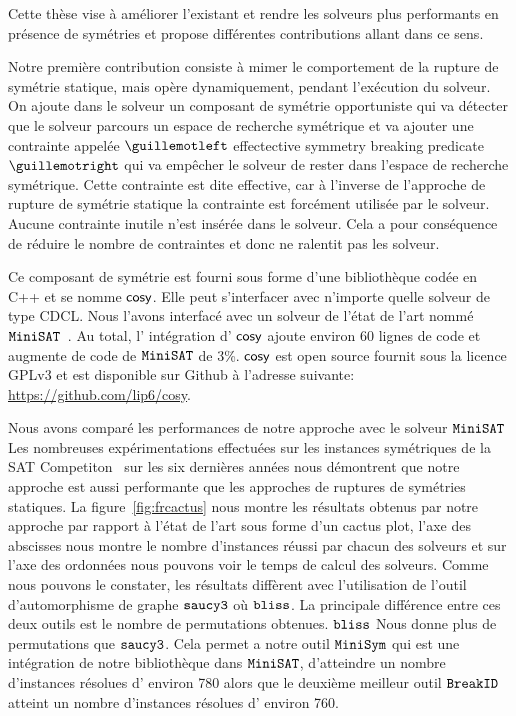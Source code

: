 Cette thèse vise à améliorer l'existant et rendre les solveurs plus performants en présence de symétries et
propose différentes contributions allant dans ce sens.  


Notre première contribution consiste à mimer le comportement de la rupture de symétrie statique, mais 
opère dynamiquement, pendant l'exécution du solveur. On ajoute dans le solveur un composant de symétrie opportuniste qui va détecter que le solveur parcours un espace de recherche symétrique et va ajouter
une contrainte appelée $\guillemotleft$ effectective symmetry breaking predicate $\guillemotright$ qui va empêcher le solveur de rester dans
l'espace de recherche symétrique. Cette contrainte est dite effective, car à l'inverse de l'approche 
de rupture de symétrie  statique la contrainte est forcément utilisée par le solveur. Aucune contrainte
inutile n’est insérée dans le solveur. Cela a pour conséquence de réduire le nombre de contraintes et donc 
ne ralentit pas les solveur.


Ce composant de symétrie est fourni sous forme d'une bibliothèque codée en C++ et se nomme $\textsf{cosy}$.
Elle peut s'interfacer avec n'importe quelle solveur de type CDCL. 
Nous l'avons interfacé avec un solveur de l'état de l'art nommé $\texttt{MiniSAT}$~\cite{een2003extensible}. Au total, l' intégration d’ $\textsf{cosy}$ ajoute environ 60 lignes de code 
et augmente de code de $\texttt{MiniSAT}$ de 3\%.
$\textsf{cosy}$ est open source fournit sous la licence GPLv3 et est disponible sur Github à l'adresse suivante: \url{https://github.com/lip6/cosy}.


Nous avons comparé les performances de notre approche avec le solveur $\texttt{MiniSAT}$
Les nombreuses expérimentations effectuées sur les instances symétriques de la SAT Competiton~\cite{jarvisalo2012international} sur les six dernières années nous démontrent que notre approche est aussi performante que les approches de ruptures de symétries statiques.
La figure~\ref{fig:frcactus} nous montre les résultats obtenus par notre approche par rapport à l'état de l'art sous forme 
d'un cactus plot, l'axe des abscisses nous montre le nombre d'instances réussi par chacun des solveurs et sur l'axe des ordonnées nous pouvons voir
le temps de calcul des solveurs. Comme nous pouvons le constater, les résultats diffèrent avec l'utilisation de l'outil d'automorphisme de 
graphe $\texttt{saucy3}$ où $\texttt{bliss}$. La principale différence entre ces deux outils est le nombre de permutations obtenues. $\texttt{bliss}$ Nous donne plus
de permutations que $\texttt{saucy3}$. Cela permet a notre outil $\texttt{MiniSym}$ qui est une intégration de notre bibliothèque dans $\texttt{MiniSAT}$, d'atteindre 
un nombre d'instances résolues d’ environ 780 alors que le deuxième meilleur outil $\texttt{BreakID}$ atteint un nombre d'instances résolues d’ environ 760.


